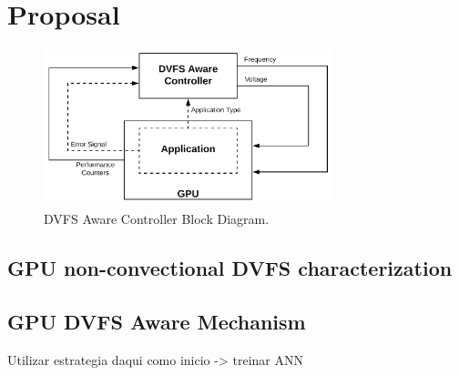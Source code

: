 
\chapter{Proposal}
\label{chapter:implementation}


\begin{figure}[!htb]
  \centering
  \includegraphics[width=0.75\textwidth]{Figures/Proposel/DVFS_Aware_Controller.png}
  \caption[Controller]{DVFS Aware Controller Block Diagram.}
  \label{fig:controlerDVFSaware}
\end{figure}


\section{GPU non-convectional DVFS characterization}

\section{GPU DVFS Aware Mechanism}
\label{section:solarch}

Utilizar estrategia daqui como inicio -> treinar ANN
